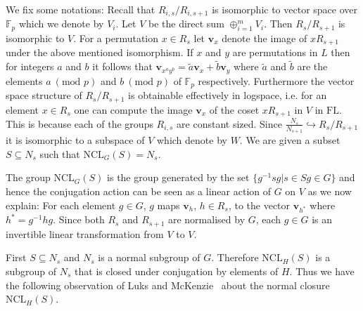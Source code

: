 \documentclass[11pt]{madras}%
\theoremstyle{remark}
\newcommand{\ModkL}[1]{{\ensuremath{\mathrm{Mod}_{#1}\mathrm{L}}}}
\newcommand{\NCL}[2][]{\ensuremath{\mathrm{NCL}_{#1}({#2})}}
\begin{document}
%  


We fix some notations: Recall that $R_{i,s}/R_{i,s+1}$ is isomorphic
to vector space over $\mathbb{F}_p$ which we denote by $V_i$.  Let $V$
be the direct sum $\oplus_{i=1}^m V_i$. Then $R_s/R_{s+1}$ is
isomorphic to $V$.  For a permutation $x \in R_s$ let $\mathbf{v}_x$
denote the image of $xR_{s+1}$ under the above mentioned isomorphism.
If $x$ and $y$ are permutations in $L$ then for integers $a$ and $b$
it follows that $\mathbf{v}_{x^a y^b} = \tilde{a} \mathbf{v}_{x} +
\tilde{b} \mathbf{v}_y$ where $\tilde{a}$ and $\tilde{b}$ are the
elements $a \ (\textrm{mod } p)$ and $b \ (\textrm{mod } p)$ of
$\mathbb{F}_p$ respectively.  Furthermore the vector space structure
of $R_s/R_{s+1}$ is obtainable effectively in logspace, i.e. for an
element $x \in R_s$ one can compute the image $\mathbf{v}_x$ of the
coset $xR_{s+1}$ in $V$ in $\mathrm{FL}$.  This is because each of the
groups $R_{i,s}$ are constant sized.  Since $\frac{N_s}{N_{s+1}}
\hookrightarrow R_s/R_{s+1}$ it is isomorphic to a subspace of $V$
which denote by $W$.  We are given a subset $S \subseteq N_s$ such
that $\NCL[G]{S} = N_s$.


The group $ \NCL[G]{S}$ is the group generated by the set $\{ g^{-1}s
g| s \in S g \in G \}$ and hence the conjugation action can be seen as
a linear action of $G$ on $V$ as we now explain: For each element $g
\in G$, $g$ maps $\mathbf{v}_h $, $h \in R_s$, to the vector
$\mathbf{v}_{h^*}$ where $h^* =g^{-1}hg$.  Since both $R_s$ and
$R_{s+1}$ are normalised by $G$, each $g\in G$ is an invertible linear
transformation from $V$ to $V$.

First $S \subseteq N_s$ and $N_s$ is a normal subgroup of $G$.
Therefore $\NCL[H]{S}$ is a subgroup of $N_s$ that is closed under
conjugation by elements of $H$.  Thus we have the following
observation of Luks and McKenzie~\cite{luks88solvable} about the
normal closure $\NCL[H]{S}$.
\end{document}

